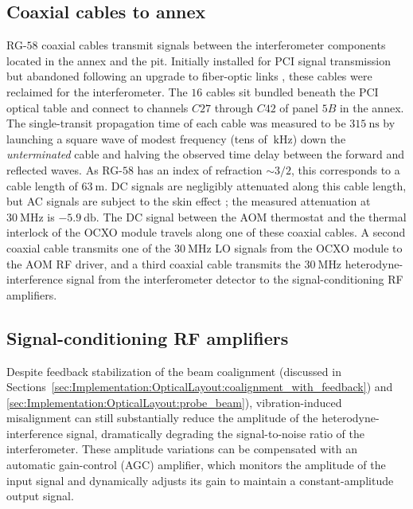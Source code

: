 \subsection{Coaxial cables to \diiid\space annex}
\label{sec:Implementation:Hardware:coax}
RG-$58$ coaxial cables transmit signals
between the interferometer components
located in the \diiid\space annex and the \diiid\space pit.
Initially installed for PCI signal transmission but
abandoned following an upgrade to fiber-optic links
\cite[Sec.~3.3.3]{dorris_phd},
these cables were reclaimed for the interferometer.
The $16$ cables sit bundled beneath the PCI optical table and
connect to channels $C27$ through $C42$
of panel $5B$ in the \diiid\space annex.
The single-transit propagation time of each cable
was measured to be $\SI{315}{\nano\second}$
by launching a square wave of modest frequency
(tens of $\SI{}{\kilo\hertz}$)
down the \emph{unterminated} cable and
halving the observed time delay between the forward and reflected waves.
As RG-$58$ has an index of refraction $\sim 3 / 2$,
this corresponds to a cable length of $\SI{63}{\meter}$.
DC signals are negligibly attenuated along this cable length, but
AC signals are subject to the skin effect
\cite[Sec.~H.1.4]{horowitz_and_hill};
the measured attenuation at $\SI{30}{\mega\hertz}$ is $\SI{-5.9}{\decibel}$.
The DC signal between the AOM thermostat and
the thermal interlock of the OCXO module
travels along one of these coaxial cables.
A second coaxial cable transmits
one of the $\SI{30}{\mega\hertz}$ LO signals
from the OCXO module
to the AOM RF driver, and
a third coaxial cable transmits
the $\SI{30}{\mega\hertz}$ heterodyne-interference signal
from the interferometer detector
to the signal-conditioning RF amplifiers.


\subsection{Signal-conditioning RF amplifiers}
\label{sec:Implementation:Hardware:RF_amps}
Despite feedback stabilization of the beam coalignment
(discussed in
Sections~\ref{sec:Implementation:OpticalLayout:coalignment_with_feedback})
and \ref{sec:Implementation:OpticalLayout:probe_beam}),
vibration-induced misalignment can still substantially reduce
the amplitude of the heterodyne-interference signal,
dramatically degrading the signal-to-noise ratio of the interferometer.
These amplitude variations can be compensated
with an automatic gain-control (AGC) amplifier, which
monitors the amplitude of the input signal and
dynamically adjusts its gain
to maintain a constant-amplitude output signal.

